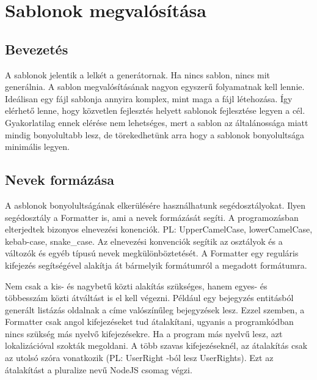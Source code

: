 \documentclass[a4paper,12pt,oneside]{report}
\begin{document}
\newpage
\section{Sablonok megvalósítása}
\subsection{Bevezetés}

\begin{justify}

	A sablonok jelentik a lelkét a generátornak. Ha nincs sablon, nincs mit generálnia. A sablon megvalósításának nagyon egyszerű folyamatnak kell lennie. Ideálisan egy fájl sablonja annyira komplex, mint maga a fájl létehozása. Így elérhető lenne, hogy közvetlen fejlesztés helyett sablonok fejlesztése legyen a cél. Gyakorlatilag ennek elérése nem lehetséges, mert a sablon az általánossága miatt mindig bonyolultabb lesz, de törekedhetünk arra hogy a sablonok bonyolultsága minimális legyen. 

\end{justify}

\newpage
\subsection{Nevek formázása}

\begin{justify}

	A asblonok bonyolultságának elkerülésére használhatunk segédosztályokat. Ilyen segédosztály a Formatter is, ami a nevek formázását segíti. A programozásban elterjedtek bizonyos elnevezési konenciók. PL: UpperCamelCase, lowerCamelCase, kebab-case, snake\_case. Az elnevezési konvenciók segítik az osztályok és a változók és egyéb típusú nevek megkülönböztetését. A Formatter egy reguláris kifejezés segítségével alakítja át bármelyik formátumról a megadott formátumra. 

	Nem csak a kis- és nagybetű közti alakítás szükséges, hanem egyes- és többesszám közti átváltást is el kell végezni. Például egy bejegyzés entitásból generált listázás oldalnak a címe valószínűleg bejegyzések lesz. Ezzel szemben, a Formatter csak angol kifejezéseket tud átalakítani, ugyanis a programkódban nincs szükség más nyelvő kifejezésekre. Ha a program más nyelvű lesz, azt lokalizációval szokták megoldani. A több szavas kifejezéseknél, az átalakítás csak az utolsó szóra vonatkozik (PL: UserRight -ból lesz UserRights). Ezt az átalakítást a pluralize nevű NodeJS csomag végzi.

\end{justify}
\end{document}
